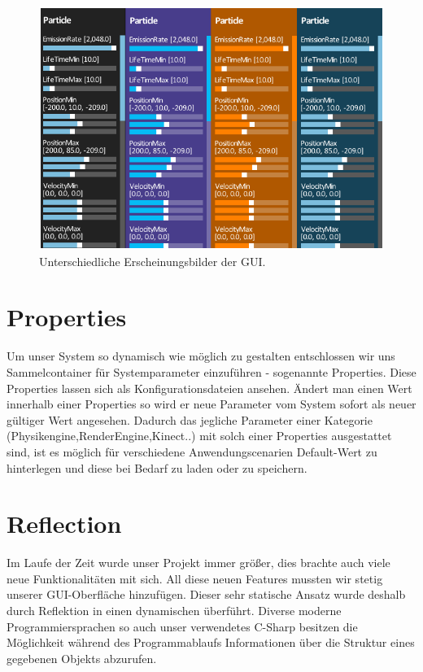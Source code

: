 \begin{figure}[h!]
	\centering
	\vspace*{30px}
	\includegraphics[width=\columnwidth]{graphics/guiThemes.png}
	\caption{Unterschiedliche Erscheinungsbilder der GUI.}
	\label{fig:GUIThemes}
\end{figure}


\section{Properties}
Um unser System so dynamisch wie möglich zu gestalten entschlossen wir uns Sammelcontainer für Systemparameter einzuführen - sogenannte Properties.
Diese Properties lassen sich als Konfigurationsdateien ansehen. Ändert man einen Wert innerhalb einer Properties so wird er neue Parameter vom System sofort als neuer gültiger Wert angesehen.
Dadurch das jegliche Parameter einer Kategorie (Physikengine,RenderEngine,Kinect..) mit solch einer Properties ausgestattet sind, ist es möglich für verschiedene Anwendungscenarien Default-Wert zu hinterlegen und diese bei Bedarf zu laden oder zu speichern.

\section{Reflection}
Im Laufe der Zeit wurde unser Projekt immer größer, dies brachte auch viele neue Funktionalitäten mit sich.
All diese neuen Features mussten wir stetig unserer GUI-Oberfläche hinzufügen. Dieser sehr statische Ansatz wurde deshalb durch Reflektion in einen dynamischen überführt.
Diverse moderne Programmiersprachen so auch unser verwendetes C-Sharp besitzen die Möglichkeit während des Programmablaufs Informationen über die Struktur eines gegebenen Objekts abzurufen.

